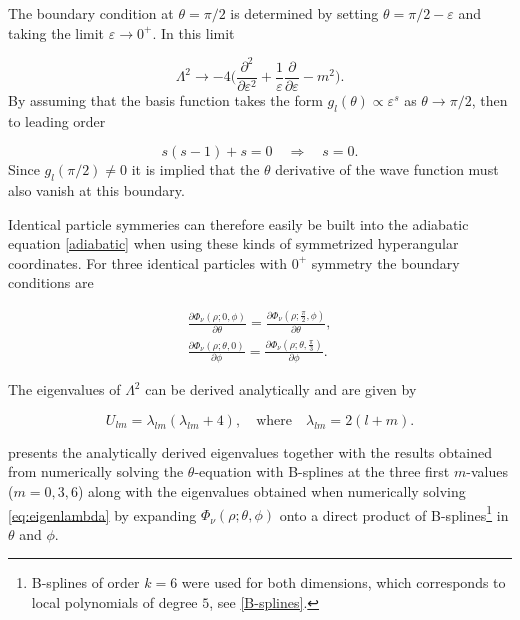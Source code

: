 The boundary condition at $\theta = \pi/2$ is determined by setting $\theta=\pi/2-\varepsilon$ and taking the limit $\varepsilon \rightarrow 0^+$. In this limit

\begin{equation}
\Lambda^{2} \rightarrow -4\Bigg(\frac{\partial^{2}}{\partial \varepsilon^{2}} + \frac{1}{\varepsilon} \frac{\partial}{\partial \varepsilon} - m^{2}\Bigg).
\end{equation}
By assuming that the basis function takes the form $g_l(\theta) \propto \varepsilon ^s$ as $\theta \rightarrow \pi/2$, then to leading order

\begin{equation}
s(s-1)+s = 0 \quad \Rightarrow \quad s=0.
\end{equation}
Since $g_l(\pi/2) \neq 0$ it is implied that the $\theta$ derivative of the wave function must also vanish at this boundary.

Identical particle symmeries can therefore easily be built into the adiabatic equation \eqref{adiabatic} when using these kinds of symmetrized hyperangular coordinates. For three identical particles with $0^+$ symmetry the boundary conditions are  

\begin{align}
\frac{\partial\Phi_{\nu}(\rho;0,\phi)}{\partial \theta} = \frac{\partial\Phi_{\nu}(\rho;\frac{\pi}{2},\phi)}{\partial \theta},\\
\frac{\partial\Phi_{\nu}(\rho;\theta,0)}{\partial \phi} = \frac{\partial\Phi_{\nu}(\rho;\theta,\frac{\pi}{3})}{\partial \phi}.
\end{align}

The eigenvalues of  $\Lambda^2$ can be derived analytically and are given by

\begin{equation}
U_{lm} = \lambda_{lm}(\lambda_{lm} + 4), \quad \text{where} \quad \lambda_{lm}=2(l+m).
\end{equation}

 presents the analytically derived eigenvalues together with the results obtained from numerically solving the $\theta$-equation with B-splines at the three first $m$-values ($m=0,3,6$) along with the eigenvalues obtained when numerically solving \eqref{eq:eigenlambda} by expanding $\Phi_{\nu}(\rho;\theta,\phi)$ onto a direct product of B-splines\footnote{B-splines of order $k=6$ were used for both dimensions, which corresponds to local polynomials of degree $5$, see \cref{B-splines}.} in $\theta$ and $\phi$. 

